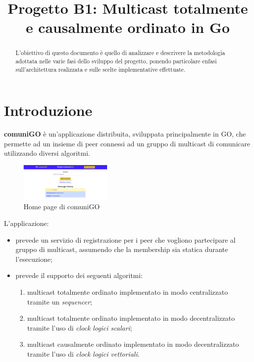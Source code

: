\documentclass[conference]{IEEEtran}
\begin{document}
\title{Progetto B1: Multicast totalmente e causalmente ordinato in Go}

\author{
}


\maketitle

\begin{abstract}
L'obiettivo di questo documento è quello di analizzare e descrivere la metodologia adottata nelle varie fasi dello sviluppo del progetto, ponendo particolare enfasi sull'architettura realizzata e sulle scelte implementative effettuate. 
\end{abstract}

\section{Introduzione}
\textbf{comuniGO} è un'applicazione distribuita, sviluppata principalmente in GO, che permette ad un insieme di peer connessi ad un gruppo di multicast di comunicare utilizzando diversi algoritmi.

\begin{figure}[htbp]
\centerline{\includegraphics[width=0.4\textwidth]{figs/home.png}}
\caption{Home page di comuniGO}
\label{fig:home}
\end{figure}

L'applicazione:
\begin{itemize}
\item prevede un servizio di registrazione per i peer che vogliono partecipare al gruppo di multicast, assumendo che la membership sia statica durante l'esecuzione;

\item prevede il supporto dei seguenti algoritmi:
\begin{enumerate}
\item multicast totalmente ordinato implementato in modo centralizzato tramite un \textsl{sequencer};

\item multicast totalmente ordinato implementato in modo decentralizzato tramite l'uso di \textsl{clock logici scalari};

\item multicast causalmente ordinato implementato in modo decentralizzato tramite l'uso di \textsl{clock logici vettoriali}.
\end{enumerate}
\end{itemize}
\end{document}
